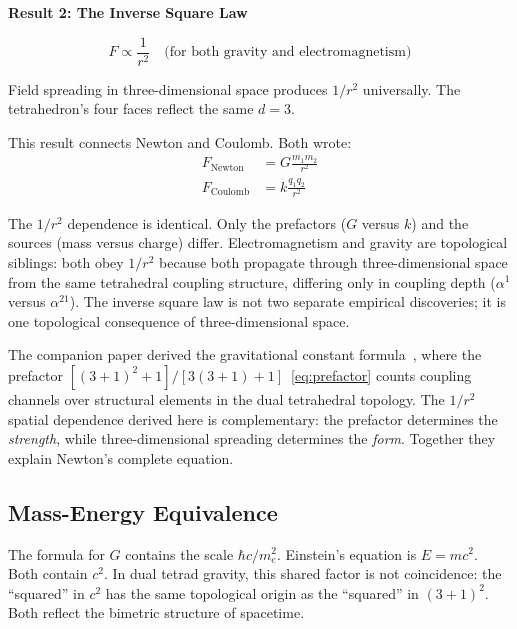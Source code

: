 \documentclass[aps,prd,preprint,superscriptaddress,showpacs,preprintnumbers,amsmath,amssymb,nofootinbib]{revtex4-2}
\begin{document}
\vspace{1.5em}
\noindent
\colorbox{resultgreen}{\parbox{\dimexpr\textwidth-2\fboxsep\relax}{%
\vspace{0.8em}
\centering
\textbf{\large Result 2: The Inverse Square Law}

\vspace{0.5em}
\boldmath
\begin{equation}
F \propto \frac{1}{r^2} \quad \text{(for both gravity and electromagnetism)}
\end{equation}
\unboldmath

\vspace{0.3em}
Field spreading in three-dimensional space produces $1/r^2$ universally. The tetrahedron's four faces reflect the same $d = 3$.
\vspace{0.5em}
}}
\vspace{1cm}

This result connects Newton and Coulomb. Both wrote:
\begin{align}
F_{\text{Newton}} &= G\frac{m_1 m_2}{r^2} \\[0.5em]
F_{\text{Coulomb}} &= k\frac{q_1 q_2}{r^2}
\end{align}

The $1/r^2$ dependence is identical. Only the prefactors ($G$ versus $k$) and the sources (mass versus charge) differ. Electromagnetism and gravity are topological siblings: both obey $1/r^2$ because both propagate through three-dimensional space from the same tetrahedral coupling structure, differing only in coupling depth ($\alpha^1$ versus $\alpha^{21}$). The inverse square law is not two separate empirical discoveries; it is one topological consequence of three-dimensional space.

The companion paper derived the gravitational constant formula~\cite{paper6}, where the prefactor $[(3+1)^2+1]/[3(3+1)+1]$~\eqref{eq:prefactor} counts coupling channels over structural elements in the dual tetrahedral topology. The $1/r^2$ spatial dependence derived here is complementary: the prefactor determines the \emph{strength}, while three-dimensional spreading determines the \emph{form}. Together they explain Newton's complete equation.

\subsection{Mass-Energy Equivalence}
\label{subsec:emc2}

The formula for $G$ contains the scale $\hbar c / m_e^2$. Einstein's equation is $E = mc^2$. Both contain $c^2$. In dual tetrad gravity, this shared factor is not coincidence: the ``squared'' in $c^2$ has the same topological origin as the ``squared'' in $(3+1)^2$. Both reflect the bimetric structure of spacetime.
\end{document}
